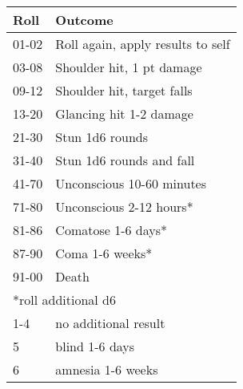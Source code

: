 \small
\begin{tabular}{@{} l l }
\textbf{Roll} & \textbf{Outcome}\\
\midrule
01-02 & Roll again, apply results to self\\
03-08 & Shoulder hit, 1 pt damage\\
09-12 & Shoulder hit, target falls\\
13-20 & Glancing hit 1-2 damage\\
21-30 & Stun 1d6 rounds\\
31-40 & Stun 1d6 rounds and fall\\
41-70 & Unconscious 10-60 minutes\\
71-80 & Unconscious 2-12 hours*\\
81-86 & Comatose 1-6 days*\\
87-90 & Coma 1-6 weeks*\\
91-00 & Death\\
\midrule
\multicolumn{2}{l}{*roll additional d6}\\
\midrule
1-4  & no additional result\\
5 & blind 1-6 days\\
6 & amnesia 1-6 weeks\\
\end{tabular}
